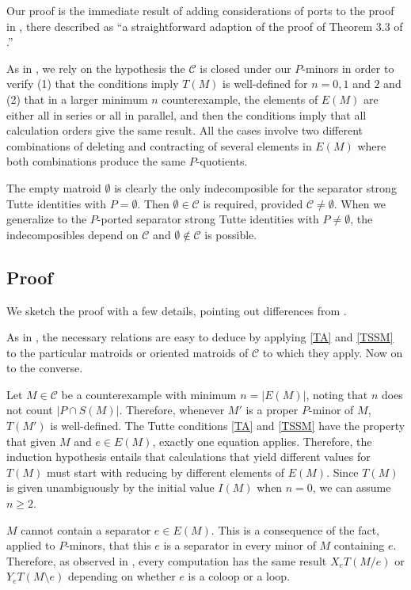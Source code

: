 \documentclass[12pt,leqno]{amsart}
\theoremstyle{remark}
\begin{document}
Our proof is the immediate result of adding considerations of ports to the
proof in \cite{Ellis-Monaghan-Traldi}, there described
as ``a straightforward adaption of the proof of Theorem 3.3 of 
\cite{MR93a:05047}.''

As in 
\cite{Ellis-Monaghan-Traldi},
we rely on the hypothesis the $\mathcal{C}$ is closed under our
$P$-minors 
in order to verify
(1) that the conditions imply $T(M)$ is well-defined for $n=0, 1$ and $2$
and (2) that in a larger minimum $n$ counterexample, the elements of
$E(M)$ are either all in series or all in parallel, 
and then the conditions
imply that all calculation orders give the same result.  All the cases involve
two different combinations of deleting and contracting of several elements
in $E(M)$ where both combinations produce the same $P$-quotients.

The empty matroid
$\emptyset$ is clearly the only indecomposible for the
separator strong Tutte identities with $P=\emptyset$.  
Then $\emptyset\in\mathcal{C}$ is required,
provided $\mathcal{C}\neq \emptyset$.
When we generalize to the
$P$-ported separator strong Tutte identities
with $P\neq\emptyset$, the indecomposibles
depend on $\mathcal{C}$ and  $\emptyset\not\in\mathcal{C}$ is possible.  

\subsection{Proof}
We sketch the proof with a few details, pointing out differences from
\cite{Ellis-Monaghan-Traldi}.

As in \cite{Ellis-Monaghan-Traldi}, 
the necessary relations are easy to deduce by 
applying \eqref{TA} and \eqref{TSSM}
to the particular
matroids or oriented matroids of $\mathcal{C}$ to which they apply.
Now on to the converse.

Let $M\in\mathcal{C}$ be a counterexample with minimum $n=|E(M)|$,
noting that $n$ does not count $|P\cap S(M)|$.
Therefore, whenever $M'$ is a proper $P$-minor of $M$,
$T(M')$ is well-defined.  The Tutte conditions \eqref{TA} and \eqref{TSSM}
have the property that given $M$ and $e\in E(M)$, exactly one equation
applies.  Therefore, the induction hypothesis entails that
calculations that yield different values for $T(M)$ must start with
reducing by different elements of $E(M)$.  Since $T(M)$ is given 
unambiguously by the initial value $I(M)$ when $n=0$, we can assume
$n\geq 2$.

$M$ cannot contain a separator $e\in E(M)$.  This is a consequence of the
fact, applied to $P$-minors, that 
this $e$ is a separator in every minor of $M$ containing $e$.
Therefore, as observed in \cite{Ellis-Monaghan-Traldi}, every
computation has the same result $X_e T(M/e)$ or $Y_e T(M\setminus e)$ 
depending
on whether $e$ is a coloop or a loop.
\end{document}
